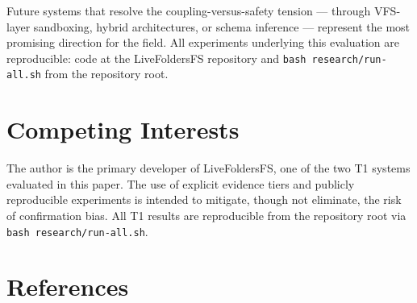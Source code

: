 \documentclass[
  11pt,
]{article}
\begin{document}
Future systems that resolve the coupling-versus-safety tension ---
through VFS-layer sandboxing, hybrid architectures, or schema inference
--- represent the most promising direction for the field. All
experiments underlying this evaluation are reproducible: code at the
LiveFoldersFS repository and \texttt{bash\ research/run-all.sh} from the
repository root.

\hypertarget{competing-interests}{%
\section{Competing Interests}\label{competing-interests}}

The author is the primary developer of LiveFoldersFS, one of the two T1
systems evaluated in this paper. The use of explicit evidence tiers and
publicly reproducible experiments is intended to mitigate, though not
eliminate, the risk of confirmation bias. All T1 results are
reproducible from the repository root via
\texttt{bash\ research/run-all.sh}.

\hypertarget{references}{%
\section*{References}\label{references}}
\end{document}
